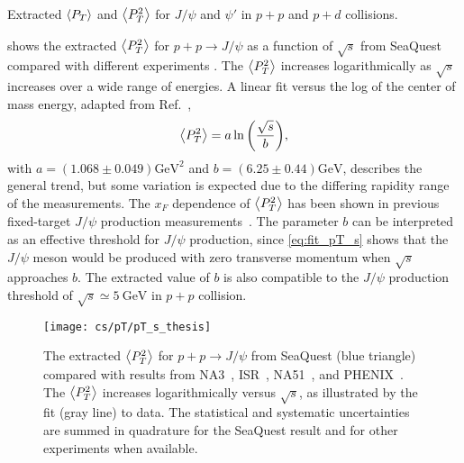 \documentclass[../main.tex]{subfiles}
\begin{document}
\begin{table}[h!]
	\centering
	\caption{Extracted $\expval{P_T}$ and $\expval{P^2_T}$ for $J/\psi$ and $\psi'$ in $p+p$ and $p+d$ collisions.}
	\label{tab:kaplan_result}
	
\end{table}

 shows the extracted $\expval{P_T^2}$ for $p+p\to J/\psi$ as a function
of $\sqrt{s}$ from SeaQuest compared with different experiments
\cite{badier1983,clark1978,drapier1998,acharya2020}. The $\expval{P_T^2}$
increases logarithmically as $\sqrt{s}$ increases over a wide range of energies.
A linear fit versus the log of the center of mass energy, adapted from Ref.~\cite{acharya2020},
\begin{equation}
	\expval{P_T^2}=a\ln{\left( \frac{\sqrt{s}}{b} \right)},
	\label{eq:fit_pT_s}
\end{equation}
with $a=\left(1.068\pm0.049\right)\unit{\GeV\squared}$ and $b=\left(6.25\pm0.44\right)\unit{\GeV}$,
describes the general trend, but some variation is expected due to the differing
rapidity range of the measurements. The $x_F$ dependence of $\expval{P_T^2}$ has been shown in
previous fixed-target $J/\psi$ production measurements~\cite{biino1987}.
The parameter $b$ can be interpreted as an effective threshold for $J/\psi$ production, 
since \cref{eq:fit_pT_s} shows that the $J/\psi$ meson would be produced with zero transverse
momentum when $\sqrt{s}$ approaches $b$.
The extracted value of $b$ is also compatible to the $J/\psi$ production threshold of $\sqrt{s}\simeq\SI{5}{\GeV}$
in $p+p$ collision.
\begin{figure}
	\centering
	\texttt{[image: cs/pT/pT\_s\_thesis]}
	\caption{The extracted $\expval{P_T^2}$ for $p+p\rightarrow J/\psi$ from SeaQuest (blue triangle) compared
		with results from NA3~\cite{badier1983}, ISR~\cite{clark1978}, NA51~\cite{drapier1998},
		and PHENIX~\cite{acharya2020}. The $\expval{P_T^2}$ increases logarithmically versus $\sqrt{s}$,
    	as illustrated by the fit (gray line) to data.
		The statistical and systematic uncertainties are summed in quadrature for
		the SeaQuest result and for other experiments when available.   }
	\label{fig:pT_s}
\end{figure}

\FloatBarrier

\ifSubfilesClassLoaded{ \printbibliography[heading=bibintoc,title={References}]}{}
\end{document}
